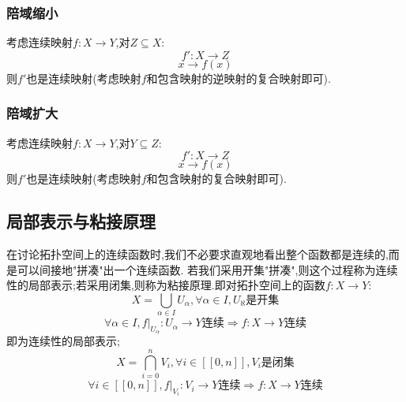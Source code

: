 \documentclass[12pt, a4paper, oneside]{ctexbook}
\newcommand{\continue }{\text{连续}}%
\begin{document}
  \subsubsection{陪域缩小}
  考虑连续映射$f:X\rightarrow Y$,对$Z\subseteq X:$
  $$
    f': X\rightarrow Z
  $$
  $$
    x\rightarrow f(x)
  $$
  则$f'$也是连续映射(考虑映射$f$和包含映射的逆映射的复合映射即可).
  \subsubsection{陪域扩大}
  考虑连续映射$f:X\rightarrow Y$,对$Y\subseteq Z:$
  $$
    f': X\rightarrow Z
  $$
  $$
    x\rightarrow f(x)
  $$
  则$f'$也是连续映射(考虑映射$f$和包含映射的复合映射即可).
  \subsection{局部表示与粘接原理 }
  在讨论拓扑空间上的连续函数时,我们不必要求直观地看出整个函数都是连续的,而是可以间接地"拼凑"出一个连续函数.
  若我们采用开集"拼凑",则这个过程称为连续性的局部表示;若采用闭集,则称为粘接原理.即对拓扑空间上的函数$f:X\rightarrow Y$:
  $$
    X=\bigcup_{\alpha\in I}U_\alpha ,\forall \alpha\in I, U_\aleph\text{是开集}
  $$
  $$
  \forall \alpha\in I,f|_{U_\alpha}:U_\alpha\rightarrow Y\continue\Rightarrow f:X\rightarrow Y\continue
  $$
  即为连续性的局部表示;
  $$
    X=\bigcap_{i=0}^{n}V_i ,\forall i\in[\![0,n]\!], V_i\text{是闭集}
  $$
  $$
    \forall i\in[\![0,n]\!],f|_{V_i}:V_i\rightarrow Y\continue\Rightarrow f:X\rightarrow Y\continue
  $$
\end{document}
